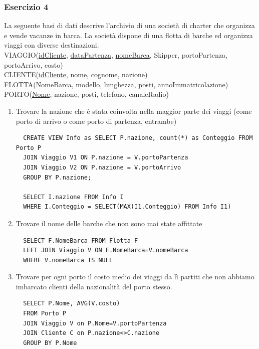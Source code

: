 \documentclass[a4paper]{article}
\begin{document}
\subsubsection{Esercizio 4}
La seguente basi di dati descrive l'archivio di una società di charter che organizza e vende vacanze in barca. La società dispone di una flotta di barche ed organizza viaggi con diverse destinazioni.\medskip\\
VIAGGIO(\underline{idCliente}, \underline{dataPartenza}, \underline{nomeBarca}, Skipper, portoPartenza, portoArrivo, costo)\\
CLIENTE(\underline{idCliente}, nome, cognome, nazione)\\
FLOTTA(\underline{NomeBarca}, modello, lunghezza, posti, annoImmatricolazione)\\
PORTO(\underline{Nome}, nazione, posti, telefono, canaleRadio)
\begin{enumerate}
\item Trovare la nazione che è stata coinvolta nella maggior parte dei viaggi (come porto di arrivo o come porto di partenza, entrambe)
  \begin{verbatim}
  CREATE VIEW Info as SELECT P.nazione, count(*) as Conteggio FROM Porto P
  JOIN Viaggio V1 ON P.nazione = V.portoPartenza
  JOIN Viaggio V2 ON P.nazione = V.portoArrivo
  GROUP BY P.nazione;

  SELECT I.nazione FROM Info I
  WHERE I.Conteggio = SELECT(MAX(I1.Conteggio) FROM Info I1)
  \end{verbatim}
\item Trovare il nome delle barche che non sono mai state affittate
  \begin{verbatim}
  SELECT F.NomeBarca FROM Flotta F
  LEFT JOIN Viaggio V ON F.NomeBarca=V.nomeBarca
  WHERE V.nomeBarca IS NULL
  \end{verbatim}
\item Trovare per ogni porto il costo medio dei viaggi da lì partiti che non abbiamo imbarcato clienti della nazionalità del porto stesso.
  \begin{verbatim}
  SELECT P.Nome, AVG(V.costo)
  FROM Porto P
  JOIN Viaggio V on P.Nome=V.portoPartenza
  JOIN Cliente C on P.nazione<>C.nazione
  GROUP BY P.Nome
  \end{verbatim}
\end{enumerate}
\end{document}
